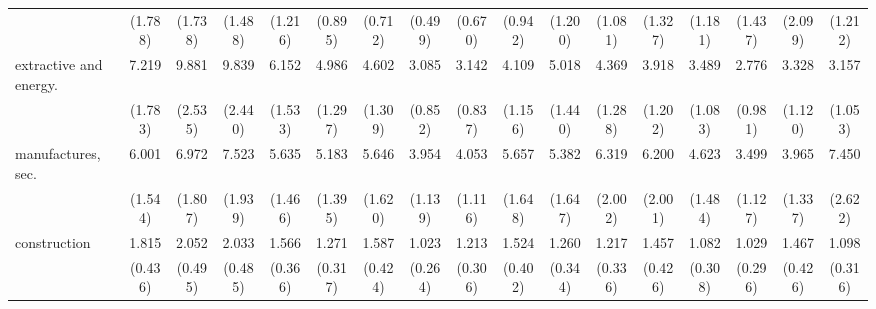 {\begin{tabular}{l*{16}{c}}
                    &     (1.788)         &     (1.738)         &     (1.488)         &     (1.216)         &     (0.895)         &     (0.712)         &     (0.499)         &     (0.670)         &     (0.942)         &     (1.200)         &     (1.081)         &     (1.327)         &     (1.181)         &     (1.437)         &     (2.099)         &     (1.212)         \\
[1em]
extractive and energy.&       7.219\sym{***}&       9.881\sym{***}&       9.839\sym{***}&       6.152\sym{***}&       4.986\sym{***}&       4.602\sym{***}&       3.085\sym{***}&       3.142\sym{***}&       4.109\sym{***}&       5.018\sym{***}&       4.369\sym{***}&       3.918\sym{***}&       3.489\sym{***}&       2.776\sym{**} &       3.328\sym{***}&       3.157\sym{***}\\
                    &     (1.783)         &     (2.535)         &     (2.440)         &     (1.533)         &     (1.297)         &     (1.309)         &     (0.852)         &     (0.837)         &     (1.156)         &     (1.440)         &     (1.288)         &     (1.202)         &     (1.083)         &     (0.981)         &     (1.120)         &     (1.053)         \\
[1em]
manufactures, sec.  &       6.001\sym{***}&       6.972\sym{***}&       7.523\sym{***}&       5.635\sym{***}&       5.183\sym{***}&       5.646\sym{***}&       3.954\sym{***}&       4.053\sym{***}&       5.657\sym{***}&       5.382\sym{***}&       6.319\sym{***}&       6.200\sym{***}&       4.623\sym{***}&       3.499\sym{***}&       3.965\sym{***}&       7.450\sym{***}\\
                    &     (1.544)         &     (1.807)         &     (1.939)         &     (1.466)         &     (1.395)         &     (1.620)         &     (1.139)         &     (1.116)         &     (1.648)         &     (1.647)         &     (2.002)         &     (2.001)         &     (1.484)         &     (1.127)         &     (1.337)         &     (2.622)         \\
[1em]
construction        &       1.815\sym{*}  &       2.052\sym{**} &       2.033\sym{**} &       1.566         &       1.271         &       1.587         &       1.023         &       1.213         &       1.524         &       1.260         &       1.217         &       1.457         &       1.082         &       1.029         &       1.467         &       1.098         \\
                    &     (0.436)         &     (0.495)         &     (0.485)         &     (0.366)         &     (0.317)         &     (0.424)         &     (0.264)         &     (0.306)         &     (0.402)         &     (0.344)         &     (0.336)         &     (0.426)         &     (0.308)         &     (0.296)         &     (0.426)         &     (0.316)         \\

\end{tabular}}
